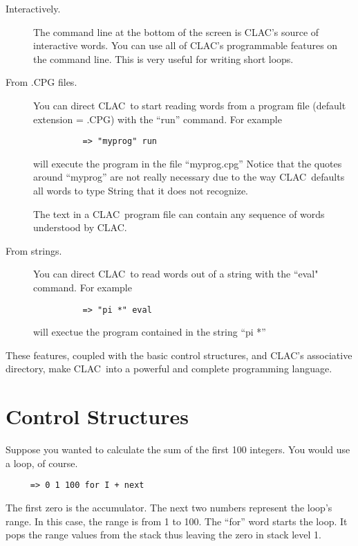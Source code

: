 \documentclass{report}
\newcommand{\CLAC}{CLAC}
\begin{document}
\begin{description}
  
\item[Interactively.] The command line at the bottom of the screen is \CLAC's source of interactive words. You can use all of \CLAC's programmable features on the command line. This is very useful for writing short loops.
  
\item[From .CPG files.] You can direct \CLAC\ to start reading words from a program file (default extension = .CPG) with the ``run'' command. For example

\begin{verbatim}
          => "myprog" run
\end{verbatim}
  
  will execute the program in the file ``myprog.cpg'' Notice that the quotes around ``myprog'' are not really necessary due to the way \CLAC\ defaults all words to type String that it does not recognize.
  
  The text in a \CLAC\ program file can contain any sequence of words understood by \CLAC.
  
\item[From strings.] You can direct \CLAC\ to read words out of a string with the ``eval" command. For example

\begin{verbatim}
          => "pi *" eval
\end{verbatim}

     will exectue the program contained in the string ``pi *''

\end{description}

These features, coupled with the basic control structures, and \CLAC's associative directory, make \CLAC\ into a powerful and complete programming language.

\section{Control Structures}

Suppose you wanted to calculate the sum of the first 100 integers. You would use a loop, of course.

\begin{verbatim}
     => 0 1 100 for I + next
\end{verbatim}

The first zero is the accumulator. The next two numbers represent the loop's range. In this case, the range is from 1 to 100. The ``for'' word starts the loop. It pops the range values from the stack thus leaving the zero in stack level 1.
\end{document}
